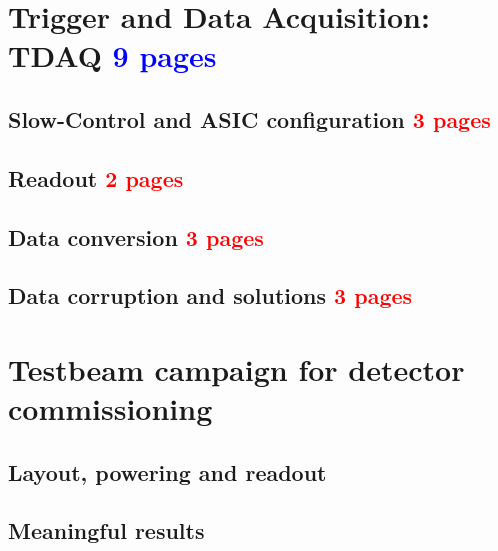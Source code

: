 	\section{Trigger and Data Acquisition: TDAQ \textcolor{blue}{ 9 pages}}
		\subsection{Slow-Control and ASIC configuration \textcolor{red}{ 3 pages}}
		\subsection{Readout \textcolor{red}{ 2 pages}}
		\subsection{Data conversion \textcolor{red}{ 3 pages}}
		\subsection{Data corruption and solutions  \textcolor{red}{ 3 pages}}

	\section{Testbeam campaign for detector commissioning}
		\subsection{Layout, powering and readout}
		\subsection{Meaningful results}